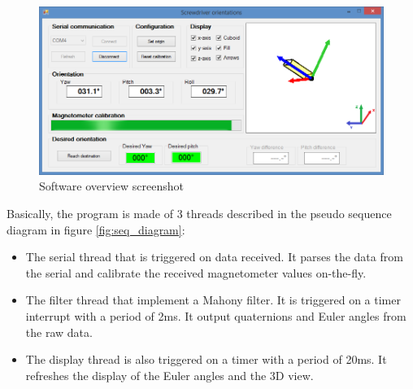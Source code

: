 \documentclass{article}
\begin{document}
\begin{figure}[ht]
  \centering
  \includegraphics[width=\textwidth]{images/overview_screenshot.png}
  \caption{Software overview screenshot}
  \label{fig:overview_screenshot}
\end{figure}

Basically, the program is made of 3 threads described in the pseudo sequence diagram in figure \ref{fig:seq_diagram}:
\begin{itemize}
    \item The serial thread that is triggered on data received. It parses the data from the serial and calibrate the received magnetometer values on-the-fly. 
    \item The filter thread that implement a Mahony filter. It is triggered on a timer interrupt with a period of 2ms. It output quaternions and Euler angles from the raw data.
    \item The display thread is also triggered on a timer with a period of 20ms. It refreshes the display of the Euler angles and the 3D view.
    
\end{itemize}
\end{document}
